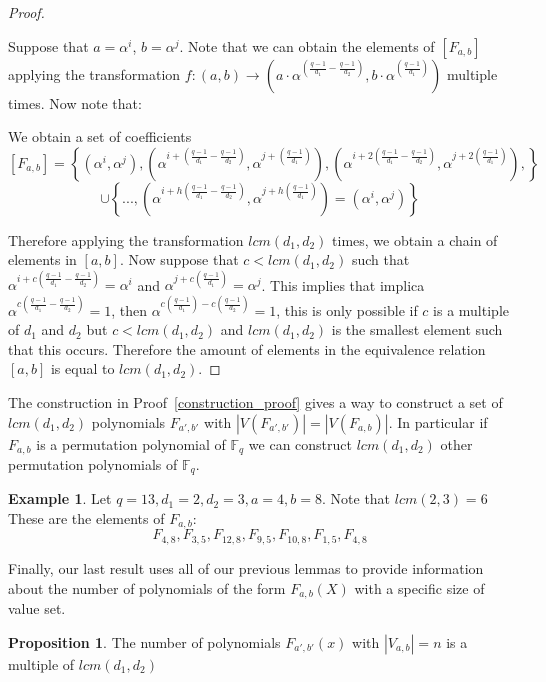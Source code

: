\documentclass{article}
\theoremstyle{definition}
\newtheorem{example}[theorem]{Example}
\newtheorem{prop}[theorem]{Proposition}
\theoremstyle{remark}
\numberwithin{equation}{section}
\begin{document}
\begin{proof}\label{construction_proof}

  Suppose that $a=\alpha^i$, $b=\alpha^j$. Note that we can obtain the elements of $[F_{a,b}]$ applying the transformation $f:(a,b) \rightarrow ( a\cdot\alpha^{(\frac{q-1}{d_1} - \frac{q-1}{d_2})}, b\cdot\alpha^{(\frac{q-1}{d_1})} )$ multiple times. Now note that:

  We obtain a set of coefficients 
  $$[F_{a,b}] = \left\{ (\alpha^i,\alpha^j), (\alpha^{i+(\frac{q-1}{d_1} - \frac{q-1}{d_2})}, \alpha^{j+(\frac{q-1}{d_1})}), (\alpha^{i+2(\frac{q-1}{d_1} - \frac{q-1}{d_2})}, \alpha^{j+2(\frac{q-1}{d_1})}),\right\}$$ 
  $$ \cup \left\{..., (\alpha^{i+h(\frac{q-1}{d_1} - \frac{q-1}{d_2})}, \alpha^{j+h(\frac{q-1}{d_1})}) = (\alpha^i, \alpha^j) \right\}$$

  Therefore applying the transformation $lcm(d_1,d_2)$ times, we obtain a chain of elements in $[a,b]$. Now suppose that $c < lcm(d_1,d_2)$ such that $\alpha^{i+c(\frac{q-1}{d_1} - \frac{q-1}{d_2})} = \alpha^i$ and $\alpha^{j+c(\frac{q-1}{d_1})} = \alpha^j$. This implies that implica $\alpha^{c(\frac{q-1}{d_1} - \frac{q-1}{d_2})} = 1$, then $\alpha^{c(\frac{q-1}{d_1}) - c(\frac{q-1}{d_2})} = 1$, this is only possible if $c$ is a multiple of $d_1$ and $d_2$ but $c < lcm(d_1,d_2)$ and $lcm(d_1,d_2)$ is the smallest element such that this occurs. Therefore the amount of elements in the equivalence relation $[a,b]$ is equal to $lcm(d_1,d_2)$.
  
\end{proof}

The construction in Proof~\ref{construction_proof} gives a way to construct a set of $lcm(d_1,d_2)$ polynomials $F_{a',b'}$ with $|V(F_{a',b'})| = |V(F_{a,b})|$. In particular if $F_{a,b}$ is a permutation polynomial of $\mathbb{F}_q$ we can construct $lcm(d_1, d_2)$ other permutation polynomials of $\mathbb{F}_q$.

 \begin{example}
    Let $q = 13, d_1 = 2, d_2 = 3, a = 4, b = 8$. Note that $lcm(2,3) = 6$ These are the elements of $F_{a,b}$:
    $$ F_{4, 8}, F_{3, 5}, F_{12, 8}, F_{9, 5}, F_{10, 8}, F_{1, 5}, F_{4,8} $$
  \end{example}

Finally, our last result uses all of our previous lemmas to provide information about the number of polynomials of the form $F_{a,b}(X)$ with a specific size of value set.

\begin{prop}

  The number of polynomials $F_{a', b'}(x)$ with $|V_{a, b}| = n$ is a multiple of $lcm(d_1,d_2)$

\end{prop}
    
\end{document}
